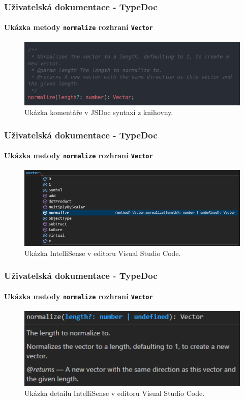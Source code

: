 \begin{frame}
    \frametitle{Uživatelská dokumentace - TypeDoc}
    \framesubtitle{Ukázka metody \texttt{normalize} rozhraní \texttt{Vector}}
    \begin{figure}
        \centering
        \includegraphics[height=0.5\textheight]{../resources/snippets/typeDoc/vector_normalize.ts.png}
        \caption{Ukázka komentáře v JSDoc syntaxi z knihovny.}
    \end{figure}
\end{frame}

\begin{frame}
    \frametitle{Uživatelská dokumentace - TypeDoc}
    \framesubtitle{Ukázka metody \texttt{normalize} rozhraní \texttt{Vector}}
    \begin{figure}
        \centering
        \includegraphics[height=0.6\textheight]{../resources/vector-normalize-suggestion-vscode.png}
        \caption{Ukázka IntelliSense v editoru Visual Studio Code.}
    \end{figure}
\end{frame}

\begin{frame}
    \frametitle{Uživatelská dokumentace - TypeDoc}
    \framesubtitle{Ukázka metody \texttt{normalize} rozhraní \texttt{Vector}}
    \begin{figure}
        \centering
        \includegraphics[height=0.5\textheight]{../resources/vector-normalize-documentation-vscode.png}
        \caption{Ukázka detailu IntelliSense v editoru Visual Studio Code.}
    \end{figure}
\end{frame}

